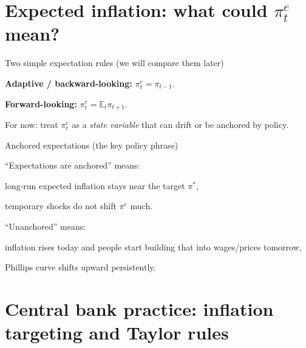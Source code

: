 \documentclass[aspectratio=169,xcolor=dvipsnames]{beamer}
\let\tempone\itemize
\let\temptwo\enditemize
\renewenvironment{itemize}{\tempone\addtolength{\itemsep}{\fill}}{\temptwo}
\let\tempa\enumerate
\let\tempb\endenumerate
\renewenvironment{enumerate}{\tempa\addtolength{\itemsep}{\fill}}{\tempb}
\begin{document}
\section{Expected inflation: what could $\pi_t^e$ mean?}

\begin{frame}{Two simple expectation rules (we will compare them later)}
\begin{enumerate}
\item \textbf{Adaptive / backward-looking:} $\pi_t^e=\pi_{t-1}$.
\item \textbf{Forward-looking:} $\pi_t^e=\mathbb{E}_t \pi_{t+1}$.
\end{enumerate}

\begin{itemize}
\item For now: treat $\pi_t^e$ as a \emph{state variable} that can drift or be anchored by policy.
\end{itemize}
\end{frame}

\begin{frame}{Anchored expectations (the key policy phrase)}
\begin{itemize}
\item ``Expectations are anchored'' means:
\begin{itemize}
\item long-run expected inflation stays near the target $\pi^\ast$,
\item temporary shocks do not shift $\pi^e$ much.
\end{itemize}
\item ``Unanchored'' means:
\begin{itemize}
\item inflation rises today and people start building that into wages/prices tomorrow,
\item Phillips curve shifts upward persistently.
\end{itemize}
\end{itemize}
\end{frame}

\section{Central bank practice: inflation targeting and Taylor rules}
\end{document}
